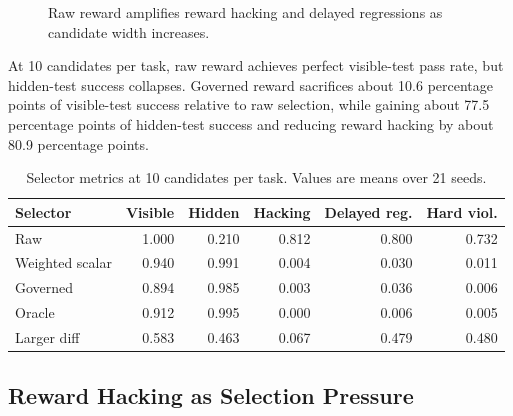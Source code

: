\documentclass[11pt]{article}
\begin{document}
\begin{figure}[t]
\centering
{}
\caption{Raw reward amplifies reward hacking and delayed regressions as candidate width increases.}
\label{fig:hacking-width}
\end{figure}

At 10 candidates per task, raw reward achieves perfect visible-test pass rate, but hidden-test success collapses. Governed reward sacrifices about 10.6 percentage points of visible-test success relative to raw selection, while gaining about 77.5 percentage points of hidden-test success and reducing reward hacking by about 80.9 percentage points.

\begin{table}[t]
\centering
\caption{Selector metrics at 10 candidates per task. Values are means over 21 seeds.}
\label{tab:selectors10}
\begin{tabular}{lrrrrr}
\toprule
Selector & Visible & Hidden & Hacking & Delayed reg. & Hard viol. \\
\midrule
Raw & 1.000 & 0.210 & 0.812 & 0.800 & 0.732 \\
Weighted scalar & 0.940 & 0.991 & 0.004 & 0.030 & 0.011 \\
Governed & 0.894 & 0.985 & 0.003 & 0.036 & 0.006 \\
Oracle & 0.912 & 0.995 & 0.000 & 0.006 & 0.005 \\
Larger diff & 0.583 & 0.463 & 0.067 & 0.479 & 0.480 \\
\bottomrule
\end{tabular}
\end{table}

\subsection{Reward Hacking as Selection Pressure}
\end{document}

